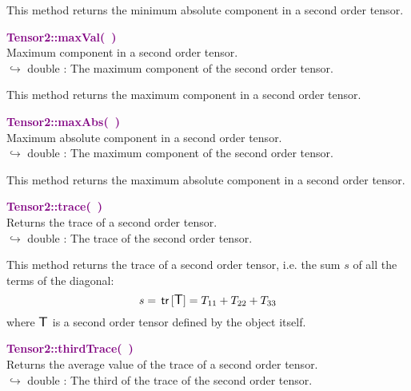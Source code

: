 This method returns the minimum absolute component in a second order tensor.

\textcolor{purple}{\textbf{Tensor2::maxVal(~)}}\label{Tensor2::maxVal()}\\
Maximum component in a second order tensor.\\ \hspace*{10mm}$\hookrightarrow$ double : The maximum component of the second order tensor.

This method returns the maximum component in a second order tensor.

\textcolor{purple}{\textbf{Tensor2::maxAbs(~)}}\label{Tensor2::maxAbs()}\\
Maximum absolute component in a second order tensor.\\ \hspace*{10mm}$\hookrightarrow$ double : The maximum component of the second order tensor.

This method returns the maximum absolute component in a second order tensor.

\textcolor{purple}{\textbf{Tensor2::trace(~)}}\label{Tensor2::trace()}\\
Returns the trace of a second order tensor.\\ \hspace*{10mm}$\hookrightarrow$ double : The trace of the second order tensor.

This method returns the trace of a second order tensor, i.e. the sum $s$ of all the terms of the diagonal:
\begin{equation*}
s = \mbox{\ensuremath{\mathsf{\,tr\,}}}[\mbox{\large\ensuremath{\mathsf{T}}}] = T_{11}+T_{22}+T_{33}
\end{equation*}
where $\mbox{\large\ensuremath{\mathsf{T}}}$ is a second order tensor defined by the object itself.

\textcolor{purple}{\textbf{Tensor2::thirdTrace(~)}}\label{Tensor2::thirdTrace()}\\
Returns the average value of the trace of a second order tensor.\\ \hspace*{10mm}$\hookrightarrow$ double : The third of the trace of the second order tensor.

